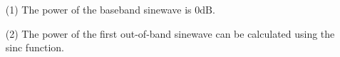 
\item[(b)]
\begin{enumerate}
    \item[(1)]
    The power of the baseband sinewave is \(0 \mathrm{dB}\).

    \item[(2)]
    The power of the first out-of-band sinewave can be calculated using the sinc function.
\end{enumerate}
